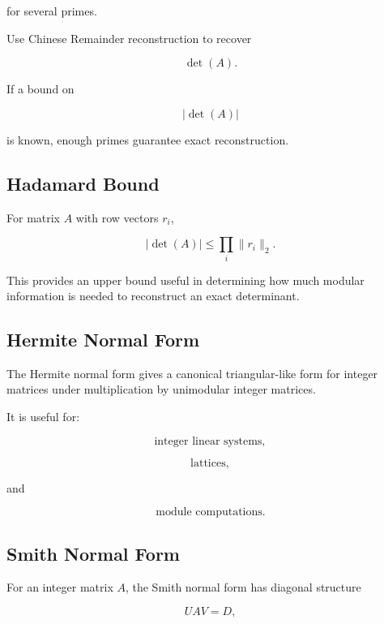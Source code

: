 for several primes.

Use Chinese Remainder reconstruction to recover

\[
\boxed{
\det(A).
}
\]

If a bound on

\[
|\det(A)|
\]

is known, enough primes guarantee exact reconstruction.

\subsection{Hadamard Bound}
\label{subsec:hadamard-bound-computer-algebra}

For matrix \(A\) with row vectors \(r_i\),

\[
\boxed{
|\det(A)|
\leq
\prod_i
\|r_i\|_2.
}
\]

This provides an upper bound useful in determining how much modular
information is needed to reconstruct an exact determinant.

\subsection{Hermite Normal Form}
\label{subsec:hermite-normal-form}

The Hermite normal form gives a canonical triangular-like form for integer
matrices under multiplication by unimodular integer matrices.

It is useful for:

\[
\boxed{
\text{integer linear systems},
}
\]

\[
\boxed{
\text{lattices},
}
\]

and

\[
\boxed{
\text{module computations}.
}
\]

\subsection{Smith Normal Form}
\label{subsec:smith-normal-form}

For an integer matrix \(A\), the Smith normal form has diagonal structure

\[
\boxed{
UAV
=
D,
}
\]

